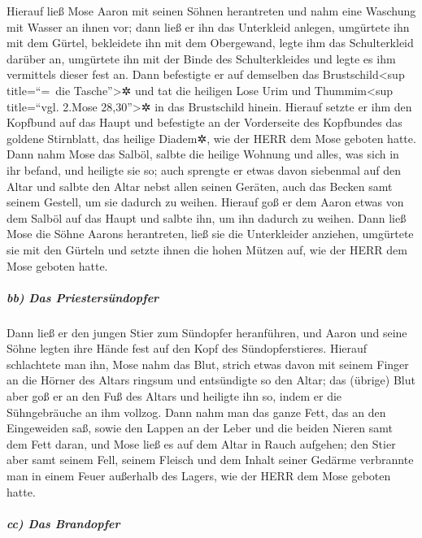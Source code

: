 Hierauf ließ Mose Aaron mit seinen Söhnen herantreten und
nahm eine Waschung mit Wasser an ihnen vor; dann ließ er
ihn das Unterkleid anlegen, umgürtete ihn mit dem Gürtel, bekleidete ihn
mit dem Obergewand, legte ihm das Schulterkleid darüber an, umgürtete
ihn mit der Binde des Schulterkleides und legte es ihm vermittels dieser
fest an. Dann befestigte er auf demselben das
Brustschild\textless sup title=``=~die Tasche''\textgreater✲ und tat die
heiligen Lose Urim und Thummim\textless sup title=``vgl. 2.Mose
28,30''\textgreater✲ in das Brustschild hinein. Hierauf
setzte er ihm den Kopfbund auf das Haupt und befestigte an der
Vorderseite des Kopfbundes das goldene Stirnblatt, das heilige Diadem✲,
wie der HERR dem Mose geboten hatte. Dann nahm Mose das
Salböl, salbte die heilige Wohnung und alles, was sich in ihr befand,
und heiligte sie so; auch sprengte er etwas davon
siebenmal auf den Altar und salbte den Altar nebst allen seinen Geräten,
auch das Becken samt seinem Gestell, um sie dadurch zu weihen.
Hierauf goß er dem Aaron etwas von dem Salböl auf das
Haupt und salbte ihn, um ihn dadurch zu weihen. Dann ließ
Mose die Söhne Aarons herantreten, ließ sie die Unterkleider anziehen,
umgürtete sie mit den Gürteln und setzte ihnen die hohen Mützen auf, wie
der HERR dem Mose geboten hatte.

\hypertarget{bb-das-priestersuxfcndopfer}{%
\subparagraph{bb) Das
Priestersündopfer}\label{bb-das-priestersuxfcndopfer}}

Dann ließ er den jungen Stier zum Sündopfer heranführen,
und Aaron und seine Söhne legten ihre Hände fest auf den Kopf des
Sündopferstieres. Hierauf schlachtete man ihn, Mose nahm
das Blut, strich etwas davon mit seinem Finger an die Hörner des Altars
ringsum und entsündigte so den Altar; das (übrige) Blut aber goß er an
den Fuß des Altars und heiligte ihn so, indem er die Sühngebräuche an
ihm vollzog. Dann nahm man das ganze Fett, das an den
Eingeweiden saß, sowie den Lappen an der Leber und die beiden Nieren
samt dem Fett daran, und Mose ließ es auf dem Altar in Rauch aufgehen;
den Stier aber samt seinem Fell, seinem Fleisch und dem
Inhalt seiner Gedärme verbrannte man in einem Feuer außerhalb des
Lagers, wie der HERR dem Mose geboten hatte.

\hypertarget{cc-das-brandopfer}{%
\subparagraph{cc) Das Brandopfer}\label{cc-das-brandopfer}}

